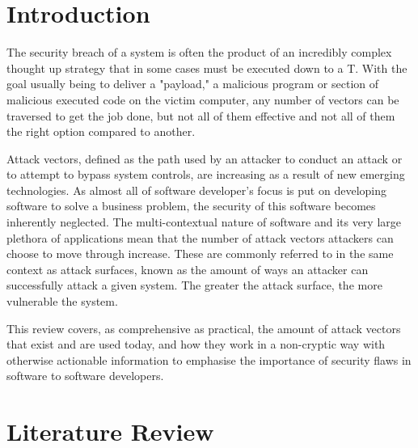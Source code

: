 \documentclass[a4paper, 11pt]{article}
\begin{document}
\tableofcontents


\pagebreak


\section{Introduction}
The security breach of a system is often the product of an incredibly complex thought up strategy \cite{ref:stuxnet2011report} that in some cases must be executed down to a T. With the goal usually being to deliver a "payload," a malicious program or section of malicious executed code on the victim computer, \cite{ref:singer2014cybersecurity} any number of vectors can be traversed to get the job done, but not all of them effective and not all of them the right option compared to another. 

Attack vectors, defined as the path used by an attacker to conduct an attack or to attempt to bypass system controls, \cite{ref:biometricattackvectors} are increasing as a result of new emerging technologies. \cite{ref:jang2014survey} As almost all of software developer's focus is put on developing software to solve a business problem, the security of this software becomes inherently neglected. The multi-contextual nature of software and its very large plethora of applications mean that the number of attack vectors attackers can choose to move through increase. These are commonly referred to in the same context as attack surfaces, known as the amount of ways an attacker can successfully attack a given system. \cite{ref:manadhata2010attack} The greater the attack surface, the more vulnerable the system.

This review covers, as comprehensive as practical, the amount of attack vectors that exist and are used today, and how they work in a non-cryptic way with otherwise actionable information to emphasise the importance of security flaws in software to software developers.

\section{Literature Review}
\end{document}
